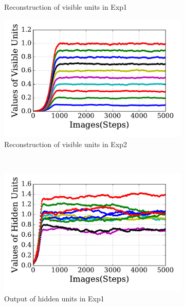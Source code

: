 \begin{figure}
\begin{subfigure}[t]{0.45\textwidth}
		\caption{Reconstruction of visible units in Exp1}
	\end{subfigure}
	\begin{subfigure}[t]{0.45\textwidth}
		\includegraphics[width=\textwidth]{pics_sdlm/30_exp_RBM/exp2_recon_non.pdf}
		\caption{Reconstruction of visible units in Exp2}
	\end{subfigure}\\
	\begin{subfigure}[t]{0.45\textwidth}
		\includegraphics[width=\textwidth]{pics_sdlm/30_exp_RBM/exp1_hid_non.pdf}
		\caption{Output of hidden units in Exp1}
	\end{subfigure}
	\begin{subfigure}[t]{0.45\textwidth}

\end{subfigure}
\end{figure}
